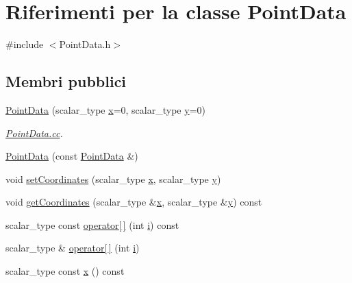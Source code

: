 \hypertarget{classPointData}{\section{Riferimenti per la classe Point\-Data}
\label{classPointData}
}


{\ttfamily \#include $<$Point\-Data.\-h$>$}

\subsection*{Membri pubblici}
\begin{DoxyCompactItemize}
\item 
\hyperlink{classPointData_a533a569f3a96d571b47cb7417c3b8b09}{Point\-Data} (scalar\-\_\-type \hyperlink{classPointData_a5accef5ea9e813dd4517eb050f276ccf}{x}=0, scalar\-\_\-type \hyperlink{classPointData_a90dbf32a9579cb1cde67458d4ad38209}{y}=0)
\begin{DoxyCompactList}\small\item\em \hyperlink{PointData_8cc}{Point\-Data.\-cc}. \end{DoxyCompactList}\item 
\hyperlink{classPointData_a110696aaa98e78579880de5b83a93c9e}{Point\-Data} (const \hyperlink{classPointData}{Point\-Data} \&)
\item 
void \hyperlink{classPointData_ab78a09aa5b435105ea30c3b3d327bb82}{set\-Coordinates} (scalar\-\_\-type \hyperlink{classPointData_a5accef5ea9e813dd4517eb050f276ccf}{x}, scalar\-\_\-type \hyperlink{classPointData_a90dbf32a9579cb1cde67458d4ad38209}{y})
\item 
void \hyperlink{classPointData_a9cbe93016a271a90a23c44fe4830cc68}{get\-Coordinates} (scalar\-\_\-type \&\hyperlink{classPointData_a5accef5ea9e813dd4517eb050f276ccf}{x}, scalar\-\_\-type \&\hyperlink{classPointData_a90dbf32a9579cb1cde67458d4ad38209}{y}) const 
\item 
scalar\-\_\-type const \hyperlink{classPointData_a0dc393437f21f7d81f3befc323ef5ff2}{operator\mbox{[}$\,$\mbox{]}} (int \hyperlink{matrici_8m_a6f6ccfcf58b31cb6412107d9d5281426}{i}) const 
\item 
scalar\-\_\-type \& \hyperlink{classPointData_a1a78e025d26ab02f1217095cf8114d73}{operator\mbox{[}$\,$\mbox{]}} (int \hyperlink{matrici_8m_a6f6ccfcf58b31cb6412107d9d5281426}{i})
\item 
scalar\-\_\-type const \hyperlink{classPointData_a5accef5ea9e813dd4517eb050f276ccf}{x} () const 
\item 

\end{DoxyCompactItemize}
